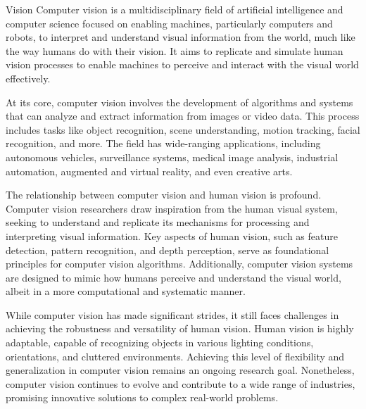 \begin{notes}{Vision}
    Computer vision is a multidisciplinary field of artificial intelligence and computer science focused on enabling machines, particularly computers and robots, to interpret and understand visual 
    information from the world, much like the way humans do with their vision. It aims to replicate and simulate human vision processes to enable machines to perceive and interact with the visual
    world effectively.

    At its core, computer vision involves the development of algorithms and systems that can analyze and extract information from images or video data. This process includes tasks like object 
    recognition, scene understanding, motion tracking, facial recognition, and more. The field has wide-ranging applications, including autonomous vehicles, surveillance systems, medical image 
    analysis, industrial automation, augmented and virtual reality, and even creative arts.

    The relationship between computer vision and human vision is profound. Computer vision researchers draw inspiration from the human visual system, seeking to understand and replicate its mechanisms 
    for processing and interpreting visual information. Key aspects of human vision, such as feature detection, pattern recognition, and depth perception, serve as foundational principles for 
    computer vision algorithms. Additionally, computer vision systems are designed to mimic how humans perceive and understand the visual world, albeit in a more computational and systematic manner.

    While computer vision has made significant strides, it still faces challenges in achieving the robustness and versatility of human vision. Human vision is highly adaptable, capable of 
    recognizing objects in various lighting conditions, orientations, and cluttered environments. Achieving this level of flexibility and generalization in computer vision remains an ongoing 
    research goal. Nonetheless, computer vision continues to evolve and contribute to a wide range of industries, promising innovative solutions to complex real-world problems.
\end{notes}